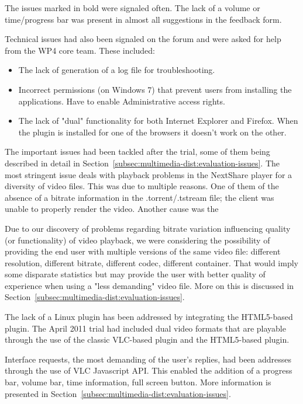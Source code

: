 The issues marked in bold were signaled often. The lack of a volume or
time/progress bar was present in almost all suggestions in the feedback form.

Technical issues had also been signaled on the forum and were asked for help
from the WP4 core team. These included:
\begin{itemize}
  \item The lack of generation of a log file for troubleshooting.
  \item Incorrect permissions (on Windows 7) that prevent users from
  installing the applications. Have to enable Administrative access rights.
  \item The lack of "dual" functionality for both Internet Explorer and
  Firefox. When the plugin is installed for one of the browsers it doesn't
  work on the other.
\end{itemize}

The important issues had been tackled after the trial, some of them being
described in detail in Section~\ref{subsec:multimedia-dist:evaluation-issues}. The most stringent issue deals with
playback problems in the NextShare player for a diversity of video files. This
was due to multiple reasons. One of them of the absence of a bitrate
information in the .torrent/.tstream file; the client was unable to properly
render the video. Another cause was the 

Due to our discovery of problems regarding bitrate variation influencing
quality (or functionality) of video playback, we were considering the
possibility of providing the end user with multiple versions of the same video
file: different resolution, different bitrate, different codec, different
container. That would imply some disparate statistics but may provide the user
with better quality of experience when using a "less demanding" video file.
More on this is discussed in Section~\ref{subsec:multimedia-dist:evaluation-issues}.

The lack of a Linux plugin has been addressed by integrating the HTML5-based
plugin. The April 2011 trial had included dual video formats that are playable
through the use of the classic VLC-based plugin and the HTML5-based plugin.

Interface requests, the most demanding of the user's replies, had been
addresses through the use of VLC Javascript API. This enabled the addition of
a progress bar, volume bar, time information, full screen button. More
information is presented in
Section~\ref{subsec:multimedia-dist:evaluation-issues}.

